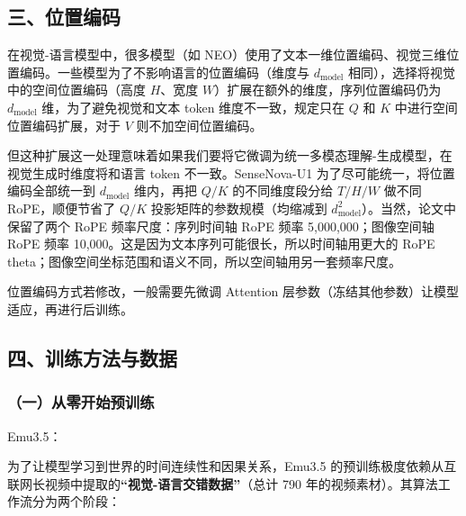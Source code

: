 \hypertarget{ux4e09ux4f4dux7f6eux7f16ux7801}{%
\subsection{三、位置编码}\label{ux4e09ux4f4dux7f6eux7f16ux7801}}

在视觉-语言模型中，很多模型（如 NEO）使用了文本一维位置编码、视觉三维位置编码。一些模型为了不影响语言的位置编码（维度与 \(d_{\mathrm{model}}\) 相同），选择将视觉中的空间位置编码（高度 \(H\)、宽度 \(W\)）扩展在额外的维度，序列位置编码仍为 \(d_{\mathrm{model}}\) 维，为了避免视觉和文本 token 维度不一致，规定只在 \(Q\) 和 \(K\) 中进行空间位置编码扩展，对于 \(V\) 则不加空间位置编码。

但这种扩展这一处理意味着如果我们要将它微调为统一多模态理解-生成模型，在视觉生成时维度将和语言 token 不一致。SenseNova-U1 为了尽可能统一，将位置编码全部统一到 \(d_{\mathrm{model}}\) 维内，再把 \(Q/K\) 的不同维度段分给 \(T/H/W\) 做不同 RoPE，顺便节省了 \(Q/K\) 投影矩阵的参数规模（均缩减到 \(d_{\mathrm{model}}^2\)）。当然，论文中保留了两个 RoPE 频率尺度：序列时间轴 RoPE 频率 5,000,000；图像空间轴 RoPE 频率 10,000。这是因为文本序列可能很长，所以时间轴用更大的 RoPE theta；图像空间坐标范围和语义不同，所以空间轴用另一套频率尺度。

位置编码方式若修改，一般需要先微调 Attention 层参数（冻结其他参数）让模型适应，再进行后训练。

\hypertarget{ux56dbux8badux7ec3ux65b9ux6cd5ux4e0eux6570ux636e}{%
\subsection{四、训练方法与数据}\label{ux56dbux8badux7ec3ux65b9ux6cd5ux4e0eux6570ux636e}}

\hypertarget{ux4e00ux4eceux96f6ux5f00ux59cbux9884ux8badux7ec3}{%
\subsubsection{（一）从零开始预训练}\label{ux4e00ux4eceux96f6ux5f00ux59cbux9884ux8badux7ec3}}

Emu3.5：

为了让模型学习到世界的时间连续性和因果关系，Emu3.5 的预训练极度依赖从互联网长视频中提取的\textbf{``视觉-语言交错数据''}（总计 790 年的视频素材）。其算法工作流分为两个阶段：

